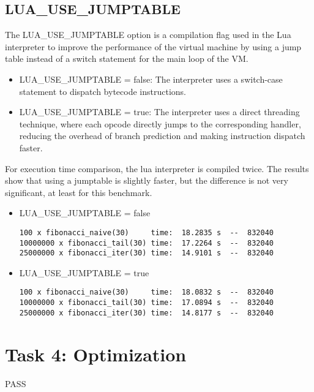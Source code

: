 \documentclass{article}
\begin{document}
	\subsection{LUA\_USE\_JUMPTABLE}
	The LUA\_USE\_JUMPTABLE option is a compilation flag used in the Lua interpreter to improve the performance of the virtual machine by using a jump table instead of a switch statement for the main loop of the VM.
	\begin{itemize}
		\item LUA\_USE\_JUMPTABLE = false: The interpreter uses a switch-case statement to dispatch bytecode instructions.
		\item LUA\_USE\_JUMPTABLE = true: The interpreter uses a direct threading technique, where each opcode directly jumps to the corresponding handler, reducing the overhead of branch prediction and making instruction dispatch faster.
	\end{itemize}
	
	For execution time comparison, the lua interpreter is compiled twice. The results show that using a jumptable is slightly faster, but the difference is not very significant, at least for this benchmark.
	\begin{itemize}
		\item LUA\_USE\_JUMPTABLE = false
		\begin{verbatim}
100 x fibonacci_naive(30)     time:  18.2835 s  --  832040
10000000 x fibonacci_tail(30) time:  17.2264 s  --  832040
25000000 x fibonacci_iter(30) time:  14.9101 s  --  832040		
		\end{verbatim}
	\item LUA\_USE\_JUMPTABLE = true
		\begin{verbatim}
100 x fibonacci_naive(30)     time:  18.0832 s  --  832040
10000000 x fibonacci_tail(30) time:  17.0894 s  --  832040
25000000 x fibonacci_iter(30) time:  14.8177 s  --  832040
		\end{verbatim}
		\end{itemize}
	
	\section{Task 4: Optimization}
	PASS
\end{document}
